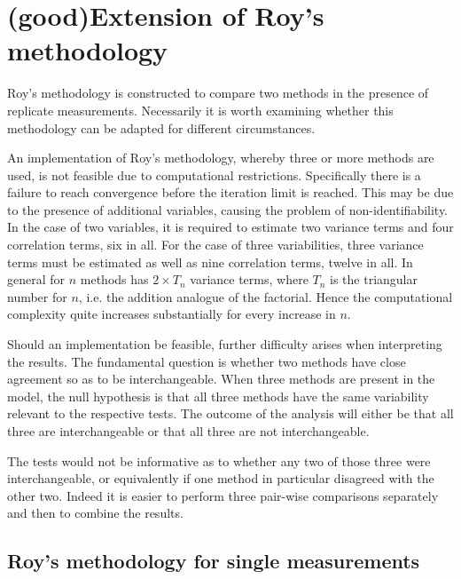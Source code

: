 \documentclass[12pt, a4paper]{report}
\theoremstyle{plain}
\theoremstyle{definition}
\theoremstyle{remark}
\begin{document}
	
	

		\section{ (good)Extension of Roy's methodology}
		Roy's methodology is constructed to compare two methods in the presence of replicate measurements. Necessarily it is worth examining whether this methodology can be adapted for different circumstances.
		
		An implementation of Roy's methodology, whereby three or more methods are used, is not feasible due to computational restrictions. Specifically there is a failure to reach convergence before the iteration limit is reached. This may be due to the presence of additional variables, causing the problem of non-identifiability. In the case of two variables, it is required to estimate two variance terms and four correlation terms, six in all. For the case of three variabilities, three variance terms must be estimated as well as nine correlation terms, twelve in all. In general for $n$ methods has $2 \times T_{n}$ variance terms, where $T_n$ is the triangular number for $n$, i.e. the addition analogue of the factorial. Hence the computational complexity quite increases substantially for every increase in $n$.
		
		Should an implementation be feasible, further difficulty arises when interpreting the results. The fundamental question is whether two methods have close agreement so as to be interchangeable. When three methods are present in the model, the null hypothesis is that all three methods have the same variability relevant to the respective tests. The outcome of the analysis will either be that all three are interchangeable or that all three are not interchangeable.
		
		The tests would not be informative as to whether any two of those three were interchangeable, or equivalently if one method in particular disagreed with the other two. Indeed it is easier to perform three pair-wise comparisons separately and then to combine the results.
		

		
		\subsection{Roy's methodology for single measurements}
		
\end{document}
